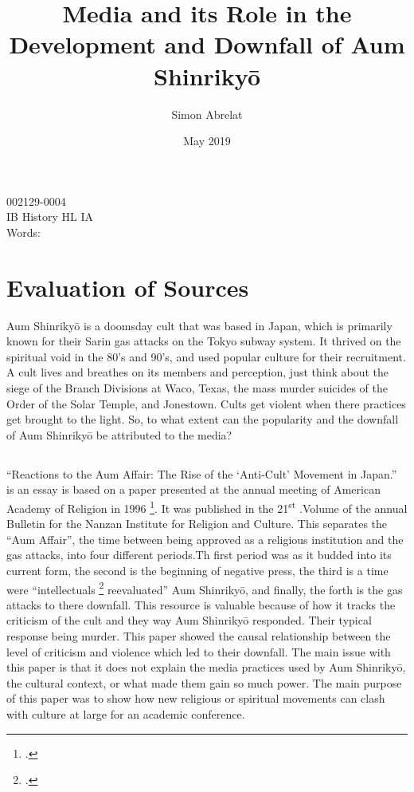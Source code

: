\documentclass[12pt, letterpaper]{article}
\title{Media and its Role in the Development and Downfall of Aum Shinriky\=o}
\author{Simon Abrelat}
\date{May 2019}
\newcommand{\sorta}[1]{`#1'}
\newcommand{\poses}[1]{#1's}
\newcommand{\say}[1]{``#1''}
\begin{document}
\doublespace{}
\parindent=0.5in

{\fontsize{12}{14.4}
  {\singlespace
    \maketitle
    \begin{center}
    002129-0004 \\
    \vspace{4mm}
    IB History HL IA \\
    \vspace{4mm}
    Words:  \\ %
    \end{center}
  }
}	


\newpage
\tableofcontents
{}
\newpage

\section{Evaluation of Sources}
Aum Shinriky\=o is a doomsday cult that was based in Japan, which is primarily known for their Sarin gas
attacks on the Tokyo subway system. It thrived on the spiritual void in the \poses{80} and  \poses{90},
and used popular culture for their recruitment. A cult lives and breathes on its members and perception,
just think about the siege of the Branch Divisions at Waco, Texas, the mass murder suicides of the Order of
the Solar Temple, and Jonestown. Cults get violent when there practices get brought to the light. So, to
what extent can the popularity and the downfall of Aum Shinriky\=o be attributed to the media?

\subsection{}
\say{Reactions to the Aum Affair: The Rise of the \sorta{Anti-Cult} Movement in Japan.} is an essay is based
on a paper presented at the annual meeting of American Academy of Religion in 1996
\footcite{manabu_reactions_1997}. It
was published in the 21\textsuperscript{st} .Volume of the annual Bulletin for the Nanzan Institute for
Religion and Culture. This separates the \say{Aum Affair}, the time between being approved as a religious
institution and the gas attacks, into four different periods.Th  first period was as it budded into its
current form, the second is the beginning of negative press, the third is a time were \say{intellectuals 
\footcite[33]{manabu_reactions_1997} reevaluated} Aum Shinriky\=o, and finally, the forth is the gas attacks to there downfall. This resource is valuable because of how it tracks the criticism of the cult and
they way Aum Shinriky\=o responded. Their typical response being murder. This paper showed the causal
relationship between the level of criticism and violence which led to their downfall. The main issue with
this paper is that it does not explain the media practices used by Aum Shinriky\=o, the cultural context, or
what made them gain so much power. The main purpose of  this paper was to show how new religious or spiritual
movements can clash with culture at large for an academic conference.
\end{document}
